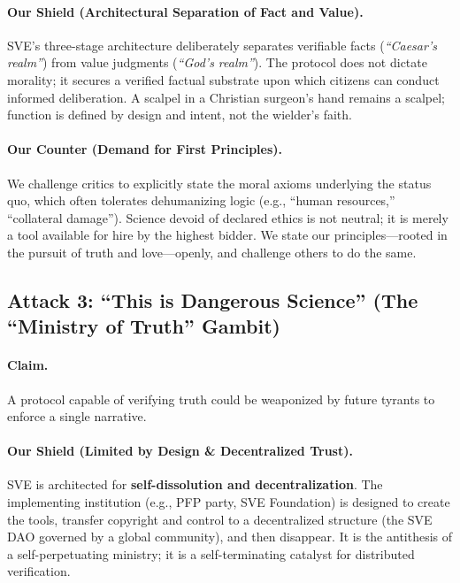\documentclass[11pt,a4paper]{article}
\begin{document}
\begin{small}
\paragraph{\textbf{Our Shield (Architectural Separation of Fact and Value).}} SVE's three-stage architecture deliberately separates verifiable facts (\textit{``Caesar's realm''}) from value judgments (\textit{``God's realm''}). The protocol does not dictate morality; it secures a verified factual substrate upon which citizens can conduct informed deliberation. A scalpel in a Christian surgeon's hand remains a scalpel; function is defined by design and intent, not the wielder's faith.

\paragraph{\textbf{Our Counter (Demand for First Principles).}} We challenge critics to explicitly state the moral axioms underlying the status quo, which often tolerates dehumanizing logic (e.g., ``human resources,'' ``collateral damage''). Science devoid of declared ethics is not neutral; it is merely a tool available for hire by the highest bidder. We state our principles—rooted in the pursuit of truth and love—openly, and challenge others to do the same.

\vspace{1em}

\subsection*{\textcolor{accentcolor}{Attack 3: ``This is Dangerous Science'' (The ``Ministry of Truth'' Gambit)}}

\paragraph{\textbf{Claim.}} A protocol capable of verifying truth could be weaponized by future tyrants to enforce a single narrative.

\paragraph{\textbf{Our Shield (Limited by Design \& Decentralized Trust).}} SVE is architected for \textbf{self-dissolution and decentralization}. The implementing institution (e.g., PFP party, SVE Foundation) is designed to create the tools, transfer copyright and control to a decentralized structure (the SVE DAO governed by a global community), and then disappear. It is the antithesis of a self-perpetuating ministry; it is a self-terminating catalyst for distributed verification.


\end{small}
\end{document}
